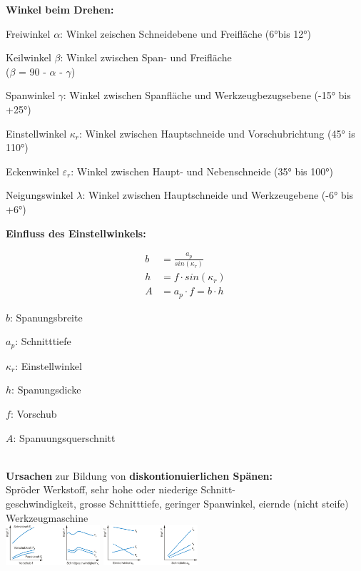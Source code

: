 \textbf{Winkel beim Drehen:}
\begin{itemize}
    \begin{tiny}
        \item Freiwinkel $\alpha$: Winkel zeischen Schneidebene und Freifläche (6°bis 12°)
        \item Keilwinkel $\beta$: Winkel zwischen Span- und Freifläche\\ ($\beta$ = 90 - $\alpha$ - $\gamma$)
        \item Spanwinkel $\gamma$: Winkel zwischen Spanfläche und Werkzeugbezugsebene (-15° bis +25°)
        \item Einstellwinkel $\kappa_r$: Winkel zwischen Hauptschneide und Vorschubrichtung (45° is 110°)
        \item Eckenwinkel $\varepsilon_r$: Winkel zwischen Haupt- und Nebenschneide (35° bis 100°)
        \item Neigungswinkel $\lambda$: Winkel zwischen Hauptschneide und Werkzeugebene (-6° bis +6°)
    \end{tiny}
    \end{itemize}

\textbf{Einfluss des Einstellwinkels:}\\

\begin{minipage}{0.5\linewidth}
    \[
    \boxed{     
        \begin{aligned}
            b &=\frac{a_p}{sin(\kappa_r)}\\
            h &=f\cdot sin(\kappa_r)\\
            A &=a_p\cdot f=b\cdot h
        \end{aligned}
        }
    \]
\end{minipage}
\begin{minipage}{0.5\linewidth}
    \begin{tiny}
    \item $b$: Spanungsbreite
    \item $a_p$: Schnitttiefe
    \item $\kappa_r$: Einstellwinkel
    \item $h$: Spanungsdicke
    \item $f$: Vorschub
    \item $A$: Spanuungsquerschnitt
    \end{tiny}
\end{minipage}\\

\textbf{Ursachen} zur Bildung von \textbf{diskontionuierlichen Spänen:}\\
Spröder Werkstoff, sehr hohe oder niederige Schnitt-\\
geschwindigkeit, grosse Schnitttiefe, geringer Spanwinkel, eiernde (nicht steife) Werkzeugmaschine\\

\includegraphics[width=35mm]{src/images/Trennen Diagramme1.jpeg}
\includegraphics[width=35mm]{src/images/Trennen Diagramme2.jpeg}\\

